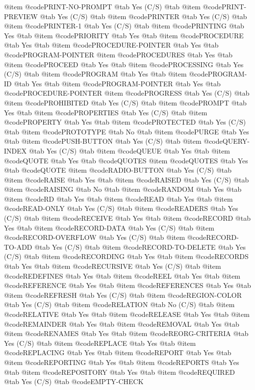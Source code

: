 @item @code{PRINT-NO-PROMPT} @tab Yes	(C/S) @tab
@item @code{PRINT-PREVIEW} @tab Yes	(C/S) @tab
@item @code{PRINTER} @tab Yes	(C/S) @tab
@item @code{PRINTER-1} @tab Yes	(C/S) @tab
@item @code{PRINTING} @tab Yes @tab
@item @code{PRIORITY} @tab Yes @tab
@item @code{PROCEDURE} @tab Yes @tab
@item @code{PROCEDURE-POINTER} @tab Yes @tab @code{PROGRAM-POINTER}
@item @code{PROCEDURES} @tab Yes @tab
@item @code{PROCEED} @tab Yes @tab
@item @code{PROCESSING} @tab Yes	(C/S) @tab
@item @code{PROGRAM} @tab Yes @tab
@item @code{PROGRAM-ID} @tab Yes @tab
@item @code{PROGRAM-POINTER} @tab Yes @tab @code{PROCEDURE-POINTER}
@item @code{PROGRESS} @tab Yes	(C/S) @tab
@item @code{PROHIBITED} @tab Yes	(C/S) @tab
@item @code{PROMPT} @tab Yes @tab
@item @code{PROPERTIES} @tab Yes	(C/S) @tab
@item @code{PROPERTY} @tab Yes @tab
@item @code{PROTECTED} @tab Yes	(C/S) @tab
@item @code{PROTOTYPE} @tab No @tab
@item @code{PURGE} @tab Yes @tab
@item @code{PUSH-BUTTON} @tab Yes	(C/S) @tab
@item @code{QUERY-INDEX} @tab Yes	(C/S) @tab
@item @code{QUEUE} @tab Yes @tab
@item @code{QUOTE} @tab Yes @tab @code{QUOTES}
@item @code{QUOTES} @tab Yes @tab @code{QUOTE}
@item @code{RADIO-BUTTON} @tab Yes	(C/S) @tab
@item @code{RAISE} @tab Yes @tab
@item @code{RAISED} @tab Yes	(C/S) @tab
@item @code{RAISING} @tab No @tab
@item @code{RANDOM} @tab Yes @tab
@item @code{RD} @tab Yes @tab
@item @code{READ} @tab Yes @tab
@item @code{READ-ONLY} @tab Yes	(C/S) @tab
@item @code{READERS} @tab Yes	(C/S) @tab
@item @code{RECEIVE} @tab Yes @tab
@item @code{RECORD} @tab Yes @tab
@item @code{RECORD-DATA} @tab Yes	(C/S) @tab
@item @code{RECORD-OVERFLOW} @tab Yes (C/S) @tab
@item @code{RECORD-TO-ADD} @tab Yes	(C/S) @tab
@item @code{RECORD-TO-DELETE} @tab Yes	(C/S) @tab
@item @code{RECORDING} @tab Yes @tab
@item @code{RECORDS} @tab Yes @tab
@item @code{RECURSIVE} @tab Yes	(C/S) @tab
@item @code{REDEFINES} @tab Yes @tab
@item @code{REEL} @tab Yes @tab
@item @code{REFERENCE} @tab Yes @tab
@item @code{REFERENCES} @tab Yes @tab
@item @code{REFRESH} @tab Yes	(C/S) @tab
@item @code{REGION-COLOR} @tab Yes	(C/S) @tab
@item @code{RELATION} @tab No	(C/S) @tab
@item @code{RELATIVE} @tab Yes @tab
@item @code{RELEASE} @tab Yes @tab
@item @code{REMAINDER} @tab Yes @tab
@item @code{REMOVAL} @tab Yes @tab
@item @code{RENAMES} @tab Yes @tab
@item @code{REORG-CRITERIA} @tab Yes (C/S) @tab
@item @code{REPLACE} @tab Yes @tab
@item @code{REPLACING} @tab Yes @tab
@item @code{REPORT} @tab Yes @tab
@item @code{REPORTING} @tab Yes @tab
@item @code{REPORTS} @tab Yes @tab
@item @code{REPOSITORY} @tab Yes @tab
@item @code{REQUIRED} @tab Yes	(C/S) @tab @code{EMPTY-CHECK}
